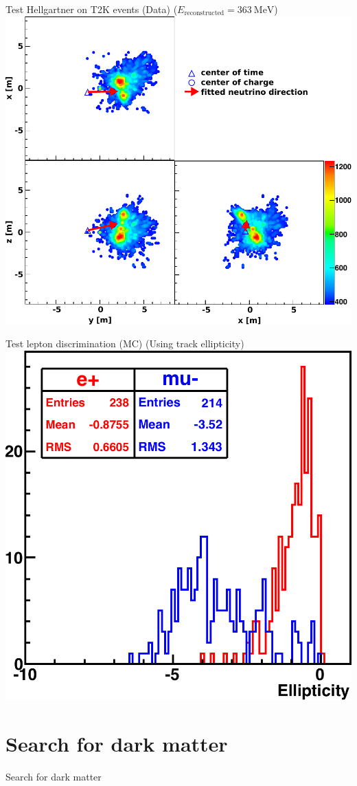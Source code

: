 \documentclass[14pt]{beamer}
\begin{document}
\begin{frame}{Test Hellgartner on T2K events (Data)}
	{($E_{\text{reconstructed}} = \SI{363}{\mega\electronvolt}$)}
	\centering
	\includegraphics[width=0.75\linewidth]{fom_map__run11339_evt39049330-cleaned.pdf}
\end{frame}


\begin{frame}{Test lepton discrimination (MC)}
	{(Using track ellipticity)}
	\centering
	\includegraphics[width=0.6\linewidth]{emu_mtq_recon_ellipticity-3Mcut.pdf}
\end{frame}

\section{Search for dark matter}
\begin{frame}
	\centering
	{\huge Search for dark matter}
\end{frame}
\end{document}
